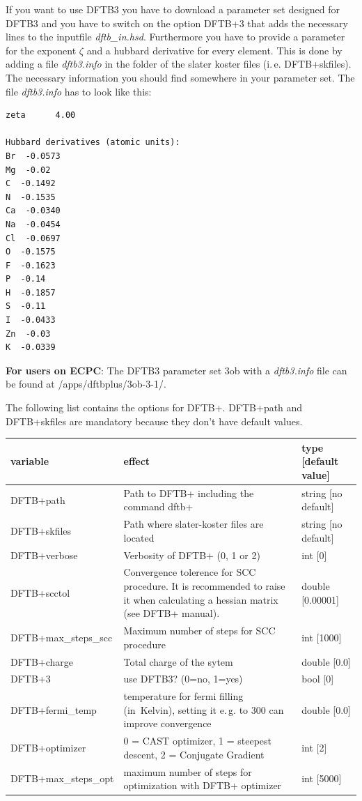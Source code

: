 \documentclass[10pt,a4paper]{article} %
\begin{document}
If you want to use DFTB3 you have to download a parameter set designed for DFTB3 and you have to switch on the option DFTB+3 that adds the necessary lines to the inputfile \textit{dftb\_in.hsd}. Furthermore you have to provide a parameter for the exponent $\zeta$ and a hubbard derivative for every element. This is done by adding a file \textit{dftb3.info} in the folder of the slater koster files (i.\,e. DFTB+skfiles). The necessary information you should find somewhere in your parameter set. The file \textit{dftb3.info} has to look like this:

\begin{lstlisting}
zeta	  4.00	

Hubbard derivatives (atomic units):
Br  -0.0573	
Mg  -0.02
C  -0.1492	
N  -0.1535
Ca  -0.0340	
Na  -0.0454
Cl  -0.0697	
O  -0.1575
F  -0.1623	
P  -0.14
H  -0.1857	
S  -0.11
I  -0.0433	
Zn  -0.03
K  -0.0339		
\end{lstlisting}

\textbf{For users on ECPC}: The DFTB3 parameter set 3ob with a \textit{dftb3.info} file can be found at /apps/dftbplus/3ob-3-1/.


The following list contains the options for DFTB+. DFTB+path and DFTB+skfiles are mandatory because they don't have default values.

		\begin{longtable}{|p{3.5cm}|p{5cm}|p{3cm}|}
		variable & effect & type [default value] \\
		\hline
			DFTB+path  & Path to DFTB+ including the command dftb+ & string [no default]\\
			DFTB+skfiles  & Path where slater-koster files are located & string [no default]\\
			DFTB+verbose & Verbosity of DFTB+ (0, 1 or 2) & int [0]\\
			DFTB+scctol & Convergence tolerence for SCC procedure. It is recommended to raise it when calculating a hessian matrix (see DFTB+ manual). & double [0.00001]\\
      DFTB+max\_steps\_scc & Maximum number of steps for SCC procedure & int [1000]\\
			DFTB+charge & Total charge of the sytem & double [0.0] \\
			DFTB+3 & use DFTB3? (0=no, 1=yes) & bool [0] \\
			DFTB+fermi\_temp & temperature for fermi filling \mbox{(in Kelvin)}, setting it e.\,g. to 300 can improve convergence & double [0.0] \\
			DFTB+optimizer & 0 = CAST optimizer, 1 = steepest descent, 2 = Conjugate Gradient & int [2] \\
			DFTB+max\_steps\_opt & maximum number of steps for optimization with DFTB+ optimizer & int [5000] \\
		\end{longtable}~\\
		
\end{document}
